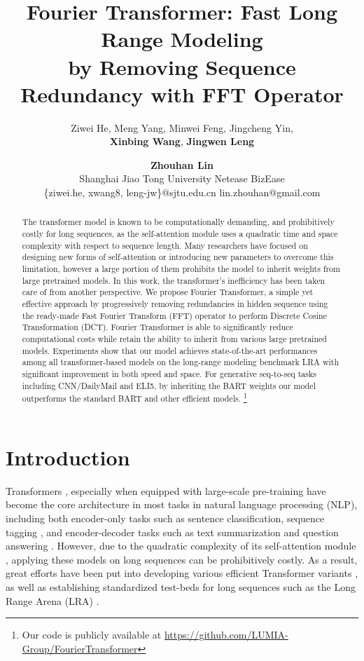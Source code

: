 \documentclass[11pt]{article}
\title{Fourier Transformer: Fast Long Range Modeling\\by Removing Sequence Redundancy with FFT Operator}
\author{
Ziwei He, 
Meng Yang, 
Minwei Feng, 
Jingcheng Yin, 
\\
\textbf{Xinbing Wang}, 
\textbf{Jingwen Leng} 
\and \textbf{Zhouhan Lin\Thanks{ Zhouhan Lin is the corresponding author.}}
\\
Shanghai Jiao Tong University
\quad  Netease BizEase
\\
\{ziwei.he, xwang8, leng-jw\}@sjtu.edu.cn
\quad lin.zhouhan@gmail.com
}
\begin{document}
\maketitle
\begin{abstract}
The transformer model is known to be computationally demanding, and prohibitively costly for long sequences, as the self-attention module uses a quadratic time and space complexity with respect to sequence length. Many researchers have focused on designing new forms of self-attention or introducing new parameters to overcome this limitation, however a large portion of them prohibits the model to inherit weights from large pretrained models.
In this work, the transformer's inefficiency has been taken care of from another perspective. We propose Fourier Transformer, a simple yet effective approach by progressively removing redundancies in hidden sequence using the ready-made Fast Fourier Transform (FFT) operator to perform Discrete Cosine Transformation (DCT). Fourier Transformer is able to significantly reduce computational costs while retain the ability to inherit from various large pretrained models.
Experiments show that our model achieves state-of-the-art performances among all transformer-based models on the long-range modeling benchmark LRA with significant improvement in both speed and space. For generative seq-to-seq tasks including CNN/DailyMail and ELI5, by inheriting the BART weights our model outperforms the standard BART and other efficient models. \footnote{Our code is publicly available at \url{https://github.com/LUMIA-Group/FourierTransformer}}
\end{abstract}

\section{Introduction}
Transformers \citep{vaswani2017attention}, especially when equipped with large-scale pre-training \citep{devlin2018bert, lewis2019bart, raffel2020exploring} have become the core architecture in most tasks in natural language processing (NLP), including both encoder-only tasks such as sentence classification, sequence tagging \citep{liu2019roberta}, and encoder-decoder tasks such as text summarization and question answering \citep{lewis2019bart}. However, due to the quadratic complexity of its self-attention module \citep{lin2017structured}, applying these models on long sequences can be prohibitively costly. As a result, great efforts have been put into developing various efficient Transformer variants \citep{tay2020efficient}, as well as establishing standardized test-beds for long sequences such as the Long Range Arena (LRA) \citep{tay2020long}.
\end{document}
